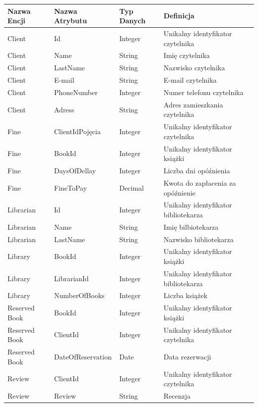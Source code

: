 \documentclass[12pt]{article}
\begin{document}
\newpage
\begin{table}[!ht]
    \centering
    \begin{tabularx}{1.01\textwidth}{llll}
        \toprule
        Nazwa Encji & Nazwa Atrybutu & Typ Danych &Definicja \\
        \bottomrule
        \toprule
        Client & Id & Integer & Unikalny identyfikator czytelnika \\
        \bottomrule
        Client & Name & String & Imię czytelnika \\
        \bottomrule
        Client & LastName & String & Nazwisko czytelnika \\
        \bottomrule
        Client & E-mail & String & E-mail czytelnika \\
        \bottomrule
        Client & PhoneNumber & Integer & Numer telefonu czytelnika \\
        \bottomrule
        Client & Adress & String & Adres zamieszkania czytelnika \\
        \bottomrule
        Fine & ClientIdPojęcia & Integer & Unikalny identyfikator czytelnika \\
        \bottomrule
        Fine & BookId & Integer & Unikalny identyfikator książki \\
        \bottomrule
        Fine & DaysOfDellay & Integer & Liczba dni opóźnienia \\
        \bottomrule
        Fine & FineToPay & Decimal & Kwota do zapłacenia za opóźnienie \\
        \bottomrule
        Librarian & Id & Integer & Unikalny identyfikator bibliotekarza \\
        \bottomrule
        Librarian & Name & String & Imię bilbiotekarza \\
        \bottomrule
        Librarian & LastName & String & Nazwisko bibliotekarza \\
        \bottomrule
        Library & BookId & Integer & Unikalny identyfikator książki \\
        \bottomrule
        Library & LibrarianId & Integer & Unikalny identyfikator bibliotekarza \\
        \bottomrule
        Library & NumberOfBooks & Integer & Liczba książek \\
        \bottomrule
        Reserved Book & BookId & Integer & Unikalny identyfikator książki \\
        \bottomrule
        Reserved Book & ClientId & Integer & Unikalny identyfikator czytelnika \\
        \bottomrule
        Reserved Book & DateOfReservation & Date & Data rezerwacji \\
        \bottomrule
        Review & ClientId & Integer & Unikalny identyfikator czytelnika \\
        \bottomrule
        Review & Review & String & Recenzja \\
        \bottomrule
    \end{tabularx}
\end{table}
\end{document}
